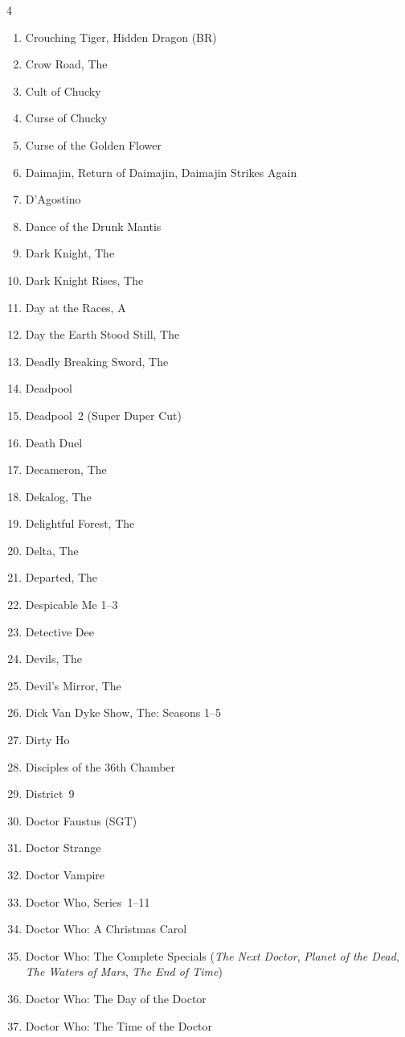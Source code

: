 \documentclass{article}
\begin{document}
\begin{multicols}{4}
\begin{enumerate}
\item Crouching Tiger, Hidden Dragon (BR)
\item Crow Road, The
\item Cult of Chucky
\item Curse of Chucky
\item Curse of the Golden Flower
\item Daimajin, Return of Daimajin, Daimajin Strikes Again
\item D'Agostino
\item Dance of the Drunk Mantis
\item Dark Knight, The
\item Dark Knight Rises, The
\item Day at the Races, A
\item Day the Earth Stood Still, The
\item Deadly Breaking Sword, The
\item Deadpool
\item Deadpool~2 (Super Duper Cut)
\item Death Duel
\item Decameron, The
\item Dekalog, The
\item Delightful Forest, The
\item Delta, The
\item Departed, The
\item Despicable Me 1--3
\item Detective Dee
\item Devils, The
\item Devil's Mirror, The
\item Dick Van Dyke Show, The: Seasons 1--5
\item Dirty Ho
\item Disciples of the 36th Chamber
\item District~9
\item Doctor Faustus (SGT)
\item Doctor Strange
\item Doctor Vampire
\item Doctor Who, Series~1--11
\item Doctor Who: A Christmas Carol
\item Doctor Who: The Complete Specials (\emph{The Next Doctor},
  \emph{Planet of the Dead}, \emph{The Waters of Mars}, \emph{The End
    of Time})
\item Doctor Who: The Day of the Doctor
\item Doctor Who: The Time of the Doctor

\end{enumerate}
\end{multicols}
\end{document}
